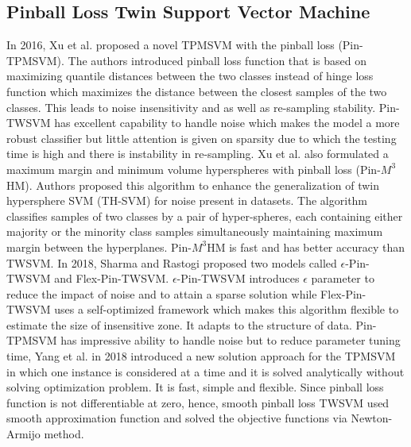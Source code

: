 \documentclass[pdflatex,sn-mathphys]{sn-jnl}%
\theoremstyle{thmstyleone}%
\theoremstyle{thmstyletwo}%
\theoremstyle{thmstylethree}%
\begin{document}
\subsection{Pinball Loss Twin Support Vector Machine}
\noindent
\newline
In 2016, Xu et al. \cite{xu2016novel} proposed a novel TPMSVM with the pinball loss (Pin-TPMSVM). The authors introduced pinball loss function that is based on maximizing quantile distances between the two classes instead of hinge loss function which maximizes the distance between the closest samples of the two classes. This leads to noise insensitivity and as well as re-sampling stability. Pin-TWSVM has excellent capability to handle noise which makes the model a more robust classifier but little attention is given on sparsity due to which the testing time is high and there is instability in re-sampling.  Xu et al.  \cite{xu2016maximum} also formulated a maximum margin and minimum volume hyperspheres with pinball loss (Pin-$M^3$HM). Authors proposed this algorithm to enhance the generalization of twin hypersphere SVM (TH-SVM) for noise present in datasets. The algorithm classifies samples of two classes by a pair of hyper-spheres, each containing either majority or the minority class samples simultaneously maintaining maximum margin between the hyperplanes. Pin-$M^3$HM is fast and has better accuracy than TWSVM. In 2018, Sharma and Rastogi \cite{sharma2018insensitive} proposed two models called $\epsilon$-Pin-TWSVM and Flex-Pin-TWSVM. $\epsilon$-Pin-TWSVM introduces $\epsilon$ parameter to reduce the impact of noise and to attain a sparse solution while Flex-Pin-TWSVM uses a self-optimized framework which makes this algorithm flexible to estimate the size of insensitive zone. It adapts to the structure of data. Pin-TPMSVM has impressive ability to handle noise but to reduce parameter tuning time, Yang et al. \cite{yang2018piecewise} in 2018 introduced a new solution approach for the TPMSVM in which one instance is considered at a time and it is solved analytically without solving optimization problem. It is fast, simple and flexible.  Since pinball loss function is not differentiable at zero, hence, smooth pinball loss TWSVM \cite{li2021smooth} used smooth approximation function and solved the objective functions via Newton-Armijo method.
\end{document}
